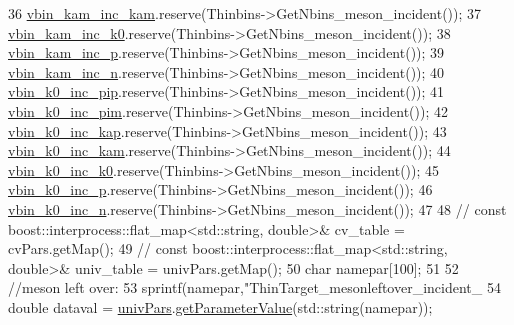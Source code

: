 \begin{DoxyCode}
36     \hyperlink{class_neutrino_flux_reweight_1_1_thin_target_meson_incident_reweighter_a3cd983d528f4fd3603fef04084751df3}{vbin\_kam\_inc\_kam}.reserve(Thinbins->GetNbins\_meson\_incident());
37     \hyperlink{class_neutrino_flux_reweight_1_1_thin_target_meson_incident_reweighter_a613978871a5d27998977245f7f9d0b69}{vbin\_kam\_inc\_k0}.reserve(Thinbins->GetNbins\_meson\_incident());
38     \hyperlink{class_neutrino_flux_reweight_1_1_thin_target_meson_incident_reweighter_a3921cfcf4c109696542983913db1927e}{vbin\_kam\_inc\_p}.reserve(Thinbins->GetNbins\_meson\_incident());
39     \hyperlink{class_neutrino_flux_reweight_1_1_thin_target_meson_incident_reweighter_acf30f4374e9357a5c8b40ff459f4d2a8}{vbin\_kam\_inc\_n}.reserve(Thinbins->GetNbins\_meson\_incident());
40     \hyperlink{class_neutrino_flux_reweight_1_1_thin_target_meson_incident_reweighter_a468f0c6421e61b547e1c14a06e23ee81}{vbin\_k0\_inc\_pip}.reserve(Thinbins->GetNbins\_meson\_incident());
41     \hyperlink{class_neutrino_flux_reweight_1_1_thin_target_meson_incident_reweighter_a75f45bee6d5c569d86fb39fc8985c063}{vbin\_k0\_inc\_pim}.reserve(Thinbins->GetNbins\_meson\_incident());
42     \hyperlink{class_neutrino_flux_reweight_1_1_thin_target_meson_incident_reweighter_af7170b60c8ca1d198bb17cbbacea10e6}{vbin\_k0\_inc\_kap}.reserve(Thinbins->GetNbins\_meson\_incident());
43     \hyperlink{class_neutrino_flux_reweight_1_1_thin_target_meson_incident_reweighter_ad783e52b4a6206cbb7276d4d168b4807}{vbin\_k0\_inc\_kam}.reserve(Thinbins->GetNbins\_meson\_incident());
44     \hyperlink{class_neutrino_flux_reweight_1_1_thin_target_meson_incident_reweighter_a965f246458feafcee2f9931b2678efd8}{vbin\_k0\_inc\_k0}.reserve(Thinbins->GetNbins\_meson\_incident());
45     \hyperlink{class_neutrino_flux_reweight_1_1_thin_target_meson_incident_reweighter_a4504e9d8374cd8c8c631d25ceaf35a9d}{vbin\_k0\_inc\_p}.reserve(Thinbins->GetNbins\_meson\_incident());
46     \hyperlink{class_neutrino_flux_reweight_1_1_thin_target_meson_incident_reweighter_a406b7314c117edd343d2d9418b48262f}{vbin\_k0\_inc\_n}.reserve(Thinbins->GetNbins\_meson\_incident());
47 
48     \textcolor{comment}{// const boost::interprocess::flat\_map<std::string, double>& cv\_table   = cvPars.getMap();}
49     \textcolor{comment}{// const boost::interprocess::flat\_map<std::string, double>& univ\_table = univPars.getMap();}
50     \textcolor{keywordtype}{char} namepar[100];
51 
52     \textcolor{comment}{//meson left over:}
53     sprintf(namepar,\textcolor{stringliteral}{"ThinTarget\_mesonleftover\_incident\_%
54     \textcolor{keywordtype}{double} dataval = \hyperlink{class_neutrino_flux_reweight_1_1_thin_target_meson_incident_reweighter_a04e7825e0d90c6a0315028620f2ac511}{univPars}.\hyperlink{class_neutrino_flux_reweight_1_1_parameter_table_acb7dc8335b65b116f6092f2fa57ca5ed}{getParameterValue}(std::string(namepar));
}
\end{DoxyCode}
